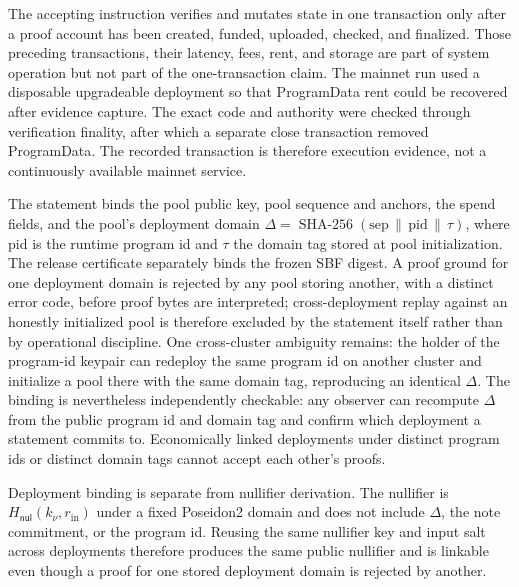The accepting instruction verifies and mutates state in one transaction only
after a proof account has been created, funded, uploaded, checked, and
finalized.  Those preceding transactions, their latency, fees, rent, and
storage are part of system operation but not part of the one-transaction
claim.  The mainnet run used a disposable upgradeable deployment so that
ProgramData rent could be recovered after evidence capture.  The exact code
and authority were checked through verification finality, after which a
separate close transaction removed ProgramData.  The recorded transaction is
therefore execution evidence, not a continuously available mainnet service.

The statement binds the pool public key, pool sequence and anchors, the spend
fields, and the pool's deployment domain
\(\Delta=\operatorname{SHA-256}(\mathrm{sep}\,\|\,\mathrm{pid}\,\|\,\tau)\),
where \(\mathrm{pid}\) is the runtime program id and \(\tau\) the domain tag
stored at pool initialization.  The release certificate separately binds the
frozen SBF digest.  A proof ground for one deployment domain is rejected by
any pool storing another, with a distinct error code, before proof bytes are
interpreted; cross-deployment replay against an honestly initialized pool is
therefore excluded by the statement itself rather than by operational
discipline.  One cross-cluster ambiguity remains: the holder of the program-id
keypair can redeploy the same program id on another cluster and initialize a
pool there with the same domain tag, reproducing an identical \(\Delta\).
The binding is nevertheless independently checkable: any observer can
recompute \(\Delta\) from the public program id and domain tag and confirm
which deployment a statement commits to.  Economically linked deployments
under distinct program ids or distinct domain tags cannot accept each
other's proofs.

Deployment binding is separate from nullifier derivation.  The nullifier is
\(H_{\mathsf{nul}}(k_\nu,r_{\mathrm{in}})\) under a fixed Poseidon2 domain and
does not include \(\Delta\), the note commitment, or the program id.  Reusing
the same nullifier key and input salt across deployments therefore produces
the same public nullifier and is linkable even though a proof for one stored
deployment domain is rejected by another.

